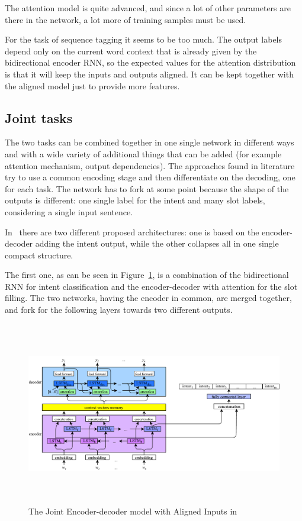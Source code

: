 The attention model is quite advanced, and since a lot of other parameters are there in the network, a lot more of training samples must be used.

For the task of sequence tagging it seems to be too much. The output labels depend only on the current word context that is already given by the bidirectional encoder RNN, so the expected values for the attention distribution is that it will keep the inputs and outputs aligned. It can be kept together with the aligned model just to provide more features.

\subsection{Joint tasks}
The two tasks can be combined together in one single network in different ways and with a wide variety of additional things that can be added (for example attention mechanism, output dependencies). The approaches found in literature try to use a common encoding stage and then differentiate on the decoding, one for each task. The network has to fork at some point because the shape of the outputs is different: one single label for the intent and many slot labels, considering a single input sentence.

In~\cite{liu2016attention} there are two different proposed architectures: one is based on the encoder-decoder adding the intent output, while the other collapses all in one single compact structure.

The first one, as can be seen in Figure~\ref{fig:jointSLUAligned}, is a combination of the bidirectional RNN for intent classification and the encoder-decoder with attention for the slot filling. The two networks, having the encoder in common, are merged together, and fork for the following layers towards two different outputs.


\begin{figure}[!htbp]
    \centering
    \includegraphics[max width=\linewidth,max height=8cm,keepaspectratio]{figures/jointSLUAligned}
    \caption{The Joint Encoder-decoder model with Aligned Inputs in~\cite{liu2016attention}}\label{fig:jointSLUAligned}
\end{figure} 


